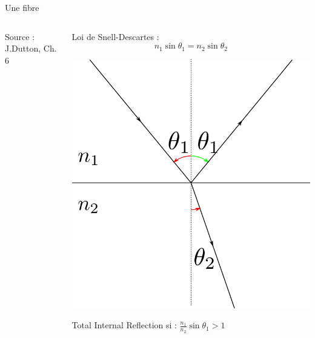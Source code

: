\documentclass[aspectratio=149, 10pt, t]{beamer}
\begin{document}
\begin{frame}{Une fibre}
\begin{columns}
\begin{column}{0.5\linewidth}
\begin{minipage}[b]{\linewidth}
                {\footnotesize Source : J.Dutton, Ch. 6}
            \end{minipage}
        \end{column}
        \begin{column}{0.5\linewidth}
            \begin{minipage}[b]{\linewidth}
                \centering
                Loi de Snell-Descartes : $$n_1\sin\theta_1=n_2\sin\theta_2$$

                \includegraphics[height=0.3\textheight]{images/snell_descartes}

                Total Internal Reflection si : $\frac{n_1}{n_2}\sin\theta_1>1$

            \end{minipage}
        \end{column}
    \end{columns}
\end{frame}
\end{document}
